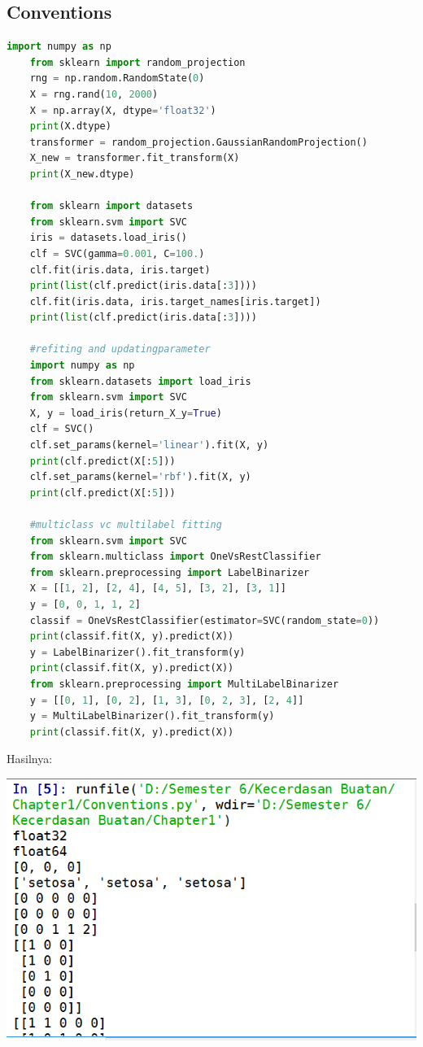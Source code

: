 \documentclass{homework}
\begin{document}
\subsection{Conventions}
\begin{lstlisting}[language=Python]
    import numpy as np
    from sklearn import random_projection
    rng = np.random.RandomState(0)
    X = rng.rand(10, 2000)
    X = np.array(X, dtype='float32')
    print(X.dtype)
    transformer = random_projection.GaussianRandomProjection()
    X_new = transformer.fit_transform(X)
    print(X_new.dtype)
    
    from sklearn import datasets
    from sklearn.svm import SVC
    iris = datasets.load_iris()
    clf = SVC(gamma=0.001, C=100.)
    clf.fit(iris.data, iris.target)
    print(list(clf.predict(iris.data[:3])))
    clf.fit(iris.data, iris.target_names[iris.target])
    print(list(clf.predict(iris.data[:3])))

    #refiting and updatingparameter
    import numpy as np
    from sklearn.datasets import load_iris
    from sklearn.svm import SVC
    X, y = load_iris(return_X_y=True)
    clf = SVC()
    clf.set_params(kernel='linear').fit(X, y)
    print(clf.predict(X[:5]))
    clf.set_params(kernel='rbf').fit(X, y)
    print(clf.predict(X[:5]))
    
    #multiclass vc multilabel fitting
    from sklearn.svm import SVC
    from sklearn.multiclass import OneVsRestClassifier
    from sklearn.preprocessing import LabelBinarizer
    X = [[1, 2], [2, 4], [4, 5], [3, 2], [3, 1]]
    y = [0, 0, 1, 1, 2]
    classif = OneVsRestClassifier(estimator=SVC(random_state=0))
    print(classif.fit(X, y).predict(X))
    y = LabelBinarizer().fit_transform(y)
    print(classif.fit(X, y).predict(X))
    from sklearn.preprocessing import MultiLabelBinarizer
    y = [[0, 1], [0, 2], [1, 3], [0, 2, 3], [2, 4]]
    y = MultiLabelBinarizer().fit_transform(y)
    print(classif.fit(X, y).predict(X))
\end{lstlisting}
Hasilnya:
\begin{center}
    \includegraphics[width=.8\textwidth]{Pict/hasil5.PNG}
\end{center}
\end{document}
